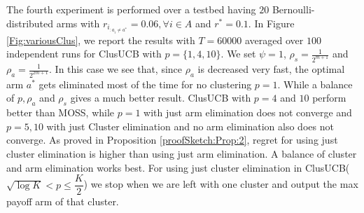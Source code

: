 The fourth experiment is performed over a testbed having $20$ Bernoulli-distributed arms with $r_{i_{:{a_{i}\neq a^{*}}}}=0.06,\forall i\in A$ and $r^{*}=0.1$. In Figure \ref{Fig:variousClus}, we report the results with $T=60000$ averaged over $100$ independent runs for ClusUCB with  $p=\lbrace 1,4,10\rbrace$. We set $\psi=1$, $\rho_{s}=\frac{1}{2^{m+1}}$ and $\rho_{a}=\frac{1}{2^{2m+1}}$. In this case we see that, since $\rho_{a}$ is decreased very fast, the optimal arm $a^{*}$ gets eliminated most of the time for no clustering $p=1$. While a balance of $p,\rho_{a}$ and $\rho_{s}$ gives a much better result. ClusUCB with $p=4$ and $10$ perform better than MOSS, while $p=1$ with just arm elimination does not converge and $p=5,10$ with just Cluster elimination and no arm elimination also does not converge. As proved in Proposition \ref{proofSketch:Prop:2}, regret for using just cluster elimination is higher than using just arm elimination. A balance of cluster and arm elimination works best. For using just 
cluster elimination in ClusUCB($\sqrt{\log K}<p\leq \dfrac{K}{2}$) we stop when we are left with one cluster and output the max payoff arm of that cluster.

